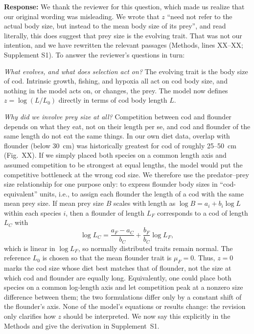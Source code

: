 \documentclass[11pt]{article}
\newcommand{\response}{\par\noindent\textbf{Response:} }
\begin{document}
\response We thank the reviewer for this question, which made us realize that our original wording was misleading. We wrote that $z$ ``need not refer to the actual body size, but instead to the mean body size of its prey'', and read literally, this does suggest that prey size is the evolving trait. That was not our intention, and we have rewritten the relevant passages (Methods, lines XX--XX; Supplement S1). To answer the reviewer's questions in turn:

\textit{What evolves, and what does selection act on?} The evolving trait is the body size of cod. Intrinsic growth, fishing, and hypoxia all act on cod body size, and nothing in the model acts on, or changes, the prey. The model now defines $z = \log(L/L_0)$ directly in terms of cod body length $L$.

\textit{Why did we involve prey size at all?} Competition between cod and flounder depends on what they eat, not on their length per se, and cod and flounder of the same length do not eat the same things. In our own diet data, overlap with flounder (below 30~cm) was historically greatest for cod of roughly 25--50~cm (Fig.~XX). If we simply placed both species on a common length axis and assumed competition to be strongest at equal lengths, the model would put the competitive bottleneck at the wrong cod size. We therefore use the predator--prey size relationship for one purpose only: to express flounder body sizes in ``cod-equivalent'' units, i.e., to assign each flounder the length of a cod with the same mean prey size. If mean prey size $B$ scales with length as $\log B = a_i + b_i \log L$ within each species $i$, then a flounder of length $L_F$ corresponds to a cod of length $L_C$ with
\begin{equation}
  \log L_C = \frac{a_F - a_C}{b_C} + \frac{b_F}{b_C} \log L_F ,
\end{equation}
which is linear in $\log L_F$, so normally distributed traits remain normal. The reference $L_0$ is chosen so that the mean flounder trait is $\mu_F = 0$. Thus, $z = 0$ marks the cod size whose diet best matches that of flounder, not the size at which cod and flounder are equally long. Equivalently, one could place both species on a common log-length axis and let competition peak at a nonzero size difference between them; the two formulations differ only by a constant shift of the flounder's axis. None of the model's equations or results change: the revision only clarifies how $z$ should be interpreted. We now say this explicitly in the Methods and give the derivation in Supplement~S1.
\end{document}
